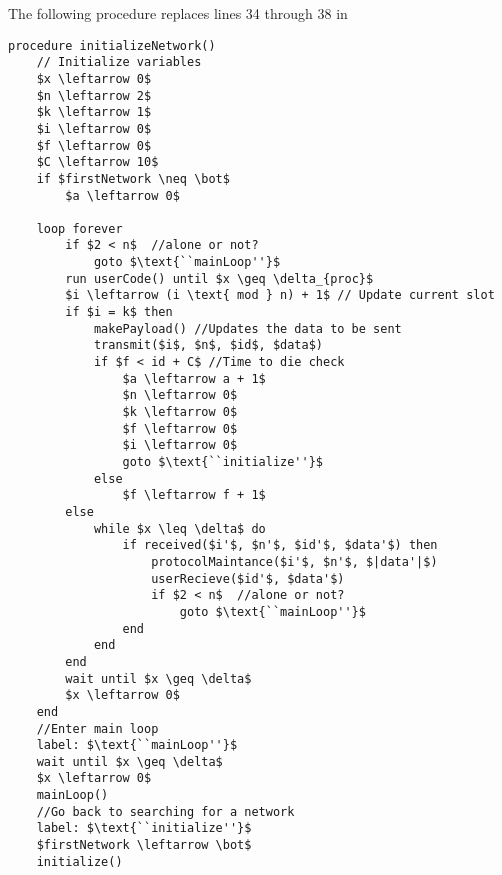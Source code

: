
\bigskip \noindent
The following procedure replaces lines 34 through 38 in 
\begin{lstlisting}[label=lst:networkMultiStartCCRC,style=pseudocode,mathescape=true,caption={Pseudocode example of the procedure initializeNetwork() for CCRC with multiconnect}]
procedure initializeNetwork()
    // Initialize variables
    $x \leftarrow 0$
    $n \leftarrow 2$
    $k \leftarrow 1$
    $i \leftarrow 0$
    $f \leftarrow 0$
    $C \leftarrow 10$
    if $firstNetwork \neq \bot$
        $a \leftarrow 0$
    
    loop forever
        if $2 < n$  //alone or not?
            goto $\text{``mainLoop''}$
        run userCode() until $x \geq \delta_{proc}$
        $i \leftarrow (i \text{ mod } n) + 1$ // Update current slot
        if $i = k$ then
            makePayload() //Updates the data to be sent
            transmit($i$, $n$, $id$, $data$)
            if $f < id + C$ //Time to die check
                $a \leftarrow a + 1$
                $n \leftarrow 0$
                $k \leftarrow 0$
                $f \leftarrow 0$
                $i \leftarrow 0$
                goto $\text{``initialize''}$
            else
                $f \leftarrow f + 1$
        else
            while $x \leq \delta$ do
                if received($i'$, $n'$, $id'$, $data'$) then
                    protocolMaintance($i'$, $n'$, $|data'|$)
                    userRecieve($id'$, $data'$)
                    if $2 < n$  //alone or not?
                        goto $\text{``mainLoop''}$
                end
            end
        end
        wait until $x \geq \delta$
        $x \leftarrow 0$ 
    end
    //Enter main loop
    label: $\text{``mainLoop''}$
    wait until $x \geq \delta$
    $x \leftarrow 0$
    mainLoop()
    //Go back to searching for a network
    label: $\text{``initialize''}$
    $firstNetwork \leftarrow \bot$
    initialize()
\end{lstlisting}

